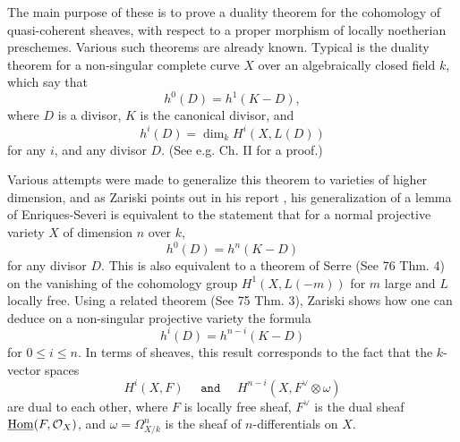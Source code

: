 The main purpose of these is to prove a duality theorem for the cohomology of quasi-coherent sheaves, with respect to a proper morphism of locally noetherian preschemes. Various such theorems are already known. Typical is the duality theorem for a non-singular complete curve $X$ over an algebraically closed field $k$, which say that
\[h^0(D)=h^1(K-D),\]
where $D$ is a divisor, $K$ is the canonical divisor, and 
\[h^{i}(D)=\dim_k H^i(X,L(D))\]
for any $i$, and any divisor $D$. (See e.g. \cite{s1959} Ch. II for a proof.) \par

Various attempts were made to generalize this theorem to varieties of higher dimension, and as Zariski points out in his report \cite{report1956}, his generalization of a lemma of Enriques-Severi \cite{z1952} is equivalent to the statement that for a normal projective variety $X$ of dimension $n$ over $k$,
\[h^0(D)=h^n(K-D)\]
for any divisor $D$. This is also equivalent to a theorem of Serre (See \cite{fac} 76 Thm. 4) on the vanishing of the cohomology group $H^1(X,L(-m))$ for $m$ large and $L$ locally free. Using a related theorem (See \cite{fac} 75 Thm. 3), Zariski shows how one can deduce on a non-singular projective variety the formula
\[h^i(D)=h^{n-i}(K-D)\]
for $0\leq i\leq n$. In terms of sheaves, this result corresponds to the fact that the $k$-vector spaces
\[H^i(X,F)\quad  \texttt{ and } \quad H^{n-i}(X,F^{\vee}\otimes \omega)\]
are dual to each other, where $F$ is locally free sheaf, $F^{\vee}$ is the dual sheaf $\underline{\mathrm{Hom}}(F,\mathcal{O}_X)$, and $\omega=\Omega^n_{X/k}$ is the sheaf of $n$-differentials on $X$.